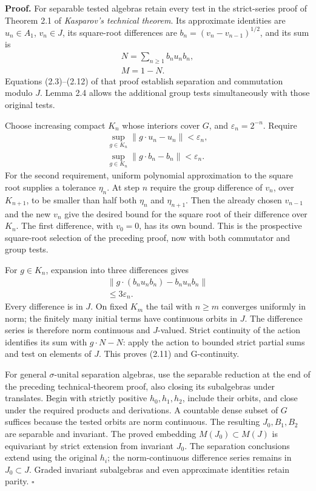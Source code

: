 \documentclass[
  11pt,
]{article}
\begin{document}
\textbf{Proof.} For separable tested algebras retain every test in the
strict-series proof of Theorem 2.1 of \emph{Kasparov's technical
theorem}. Its approximate identities are \(u_n\in A_1\), \(v_n\in J\),
its square-root differences are \(b_n=(v_n-v_{n-1})^{1/2}\), and its sum
is \[
\begin{gathered}
N=\sum_{n\geq1}b_nu_nb_n,\\
M=1-N.
\end{gathered}
\tag{2.12}
\] Equations (2.3)--(2.12) of that proof establish separation and
commutation modulo \(J\). Lemma 2.4 allows the additional group tests
simultaneously with those original tests.

Choose increasing compact \(K_n\) whose interiors cover \(G\), and
\(\varepsilon_n=2^{-n}\). Require \[
\begin{gathered}
\sup_{g\in K_n}\|g\cdot u_n-u_n\|<\varepsilon_n,\\
\sup_{g\in K_n}\|g\cdot b_n-b_n\|<\varepsilon_n.
\end{gathered}
\tag{2.13}
\] For the second requirement, uniform polynomial approximation to the
square root supplies a tolerance \(\eta_n\). At step \(n\) require the
group difference of \(v_n\), over \(K_{n+1}\), to be smaller than half
both \(\eta_n\) and \(\eta_{n+1}\). Then the already chosen \(v_{n-1}\)
and the new \(v_n\) give the desired bound for the square root of their
difference over \(K_n\). The first difference, with \(v_0=0\), has its
own bound. This is the prospective square-root selection of the
preceding proof, now with both commutator and group tests.

For \(g\in K_n\), expansion into three differences gives \[
\begin{gathered}
\|g\cdot(b_nu_nb_n)-b_nu_nb_n\|\\
\leq3\varepsilon_n.
\end{gathered}
\tag{2.14}
\] Every difference is in \(J\). On fixed \(K_m\) the tail with
\(n\geq m\) converges uniformly in norm; the finitely many initial terms
have continuous orbits in \(J\). The difference series is therefore norm
continuous and \(J\)-valued. Strict continuity of the action identifies
its sum with \(g\cdot N-N\): apply the action to bounded strict partial
sums and test on elements of \(J\). This proves (2.11) and G-continuity.

For general \(\sigma\)-unital separation algebras, use the separable
reduction at the end of the preceding technical-theorem proof, also
closing its subalgebras under translates. Begin with strictly positive
\(h_0,h_1,h_2\), include their orbits, and close under the required
products and derivations. A countable dense subset of \(G\) suffices
because the tested orbits are norm continuous. The resulting
\(J_0,B_1,B_2\) are separable and invariant. The proved embedding
\(M(J_0)\subset M(J)\) is equivariant by strict extension from invariant
\(J_0\). The separation conclusions extend using the original \(h_i\);
the norm-continuous difference series remains in \(J_0\subset J\).
Graded invariant subalgebras and even approximate identities retain
parity. \(\square\)
\end{document}
